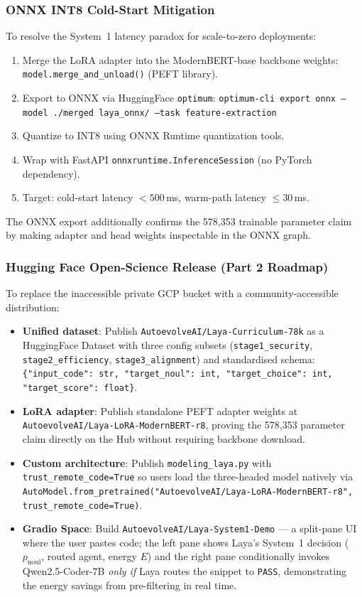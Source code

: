 \documentclass[conference]{IEEEtran}
\begin{document}
\subsubsection{ONNX INT8 Cold-Start Mitigation}

To resolve the System~1 latency paradox for scale-to-zero deployments:
\begin{enumerate}
  \item Merge the LoRA adapter into the ModernBERT-base backbone weights:
        \texttt{model.merge\_and\_unload()} (PEFT library).
  \item Export to ONNX via HuggingFace \texttt{optimum}:
        \texttt{optimum-cli export onnx --model ./merged laya\_onnx/ --task feature-extraction}
  \item Quantize to INT8 using ONNX Runtime quantization tools.
  \item Wrap with FastAPI \texttt{onnxruntime.InferenceSession} (no PyTorch dependency).
  \item Target: cold-start latency $< 500$\,ms, warm-path latency $\leq 30$\,ms.
\end{enumerate}
The ONNX export additionally confirms the 578{,}353 trainable parameter claim by
making adapter and head weights inspectable in the ONNX graph.

\subsubsection{Hugging Face Open-Science Release (Part 2 Roadmap)}

To replace the inaccessible private GCP bucket with a community-accessible distribution:
\begin{itemize}
  \item \textbf{Unified dataset}: Publish \texttt{AutoevolveAI/Laya-Curriculum-78k} as a
        HuggingFace Dataset with three config subsets (\texttt{stage1\_security},
        \texttt{stage2\_efficiency}, \texttt{stage3\_alignment}) and standardised schema:
        \texttt{\{"input\_code": str, "target\_noul": int, "target\_choice": int, "target\_score": float\}}.
  \item \textbf{LoRA adapter}: Publish standalone PEFT adapter weights at
        \texttt{AutoevolveAI/Laya-LoRA-ModernBERT-r8}, proving the 578{,}353 parameter
        claim directly on the Hub without requiring backbone download.
  \item \textbf{Custom architecture}: Publish \texttt{modeling\_laya.py} with
        \texttt{trust\_remote\_code=True} so users load the three-headed model natively
        via \texttt{AutoModel.from\_pretrained("AutoevolveAI/Laya-LoRA-ModernBERT-r8",
        trust\_remote\_code=True)}.
  \item \textbf{Gradio Space}: Build \texttt{AutoevolveAI/Laya-System1-Demo} — a split-pane UI
        where the user pastes code; the left pane shows Laya's System~1 decision ($p_\text{noul}$,
        routed agent, energy $E$) and the right pane conditionally invokes Qwen2.5-Coder-7B
        \emph{only if} Laya routes the snippet to \texttt{PASS}, demonstrating the energy
        savings from pre-filtering in real time.
\end{itemize}
\end{document}
